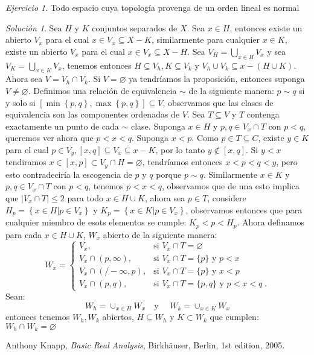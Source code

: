 \documentclass[notitlepage]{report}
\theoremstyle{definition}
\theoremstyle{remark}
\newtheorem{exc}{Ejercicio}
\newtheorem*{sol}{Solución}
\newcommand{\abs}[1]{\left| #1 \right|}
\newcommand{\set}[1]{\left\lbrace #1 \right\rbrace}
\begin{document}
\begin{exc}
	Todo espacio cuya topología provenga de un orden lineal es normal
\end{exc}

\begin{sol}
	Sea $ H $ y $ K $ conjuntos separados de $ X $. Sea $ x \in H $, entonces existe un abierto $ V_x $ para el cual $ x \in V_x \subseteq X - K $, similarmente para cualquier $ x \in K $, existe un abierto $ V_x $ para el cual $ x \in V_x \subseteq X - H $. Sea $ V_H = \bigcup_{x \in H} V_x $ y sea $ V_K = \bigcup_{x \in K} V_x $, tenemos entonces $ H \subseteq V_h, K \subseteq V_k $ y $ V_h \cup V_k \subseteq x - ( H \cup K) $. Ahora sea $ V = V_h \cap V_k $. Si $ V = \varnothing $ ya tendríamos la proposición, entonces suponga $ V \neq \varnothing $. Definimos una relación de equivalencia $ \sim $ de la siguiente manera: $ p \sim q $ si y solo si $ [\min\set{p,q}, \max \set{p,q}] \subseteq V $, observamos que las clases de equivalencia son las componentes ordenadas de $ V $. Sea $ T \subseteq V $ y $ T $ contenga exactamente un punto de cada $ \sim  $ clase. Suponga $ x \in H $ y $ p,q \in V_x \cap T $ con $ p < q $, queremos ver ahora que $ p < x < q$. Suponga $ x <p $. Como $ p \in T \subseteq C $, existe $ y \in K $ para el cual $  p \in V_y, [x,q] \subseteq V_x \subseteq x - K $, por lo tanto $ y \notin [x,q] $. Si $ y < x $ tendiramos $ x \in [x,p] \subset V_y \cap H = \varnothing $, tendríamos entonces $ x <p <q <y $, pero esto contradeciría la escogencia de $ p $ y $ q $ porque $ p \sim q $. Similarmente $ x\in K $ y $ p,q \in V_x \cap T $ con $ p <q $, tenemos $ p <x<q $, observamos que de una esto implica que $ \abs{V_x \cap T} \leq 2 $ para todo $ x \in H \cup K $, ahora sea $ p \in T $, considere $ H_p = \set{x \in H | p \in V_x} $ y $ K_p = \set{x \in K | p \in V_x} $, observamos entonces que para cualquier miembro de esots elementos se cumple: $ K_p < p < H_p $. Ahora definamos para cada $ x \in H \cup K $, $ W_x $ abierto de la siguiente manera:
	\[ W_x=\begin{cases}V_x,&\text{si }V_x\cap T=\varnothing\\V_x\cap(p,\infty),&\text{si }V_x\cap T=\{p\}\text{ y }p<x\\V_x\cap(/-\infty,p),&\text{si }V_x\cap T=\{p\}\text{ y }x<p\\V_x\cap(p,q),&\text{si }V_x\cap T=\{p,q\}\text{ y }p<x<q\;.\end{cases} \]
	Sean:
	\[ W_h = \cup_{x \in H} W_x \quad \textrm{y } \quad W_k = \cup_{x \in K}W_x \]
	entonces tenemos $ W_h, W_k $ abiertos, $ H \subseteq W_h $ y $ K \subset W_k $ que cumplen: $ W_h \cap W_k = \varnothing $ 
\end{sol}


\begin{thebibliography}{1}
	
	Anthony Knapp,
	\emph{Basic Real Analysis},
	Birkhäuser, Berlin,
	1st edition,
	2005.
	
\end{thebibliography}
\end{document}
